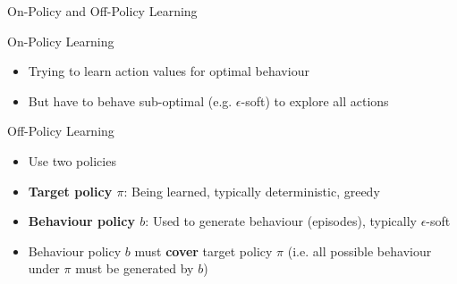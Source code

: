 \documentclass[ignorenonframetext,xcolor=x11names]{beamer}
\begin{document}
\begin{frame}{On-Policy and Off-Policy Learning}
\begin{block}{On-Policy Learning}
\begin{itemize}
   \item Trying to learn action values for optimal behaviour
   \item But have to behave sub-optimal (e.g. $\epsilon$-soft) to explore all actions
\end{itemize}
\end{block}

\begin{block}{Off-Policy Learning}
\begin{itemize}
   \item Use two policies
   \item \textbf{Target policy $\pi$}: Being learned, typically deterministic, greedy
   \item \textbf{Behaviour policy $b$}: Used to generate behaviour (episodes), typically $\epsilon$-soft
   \item Behaviour policy $b$ must \textbf{cover} target policy $\pi$ (i.e. all possible behaviour under $\pi$ must be generated by $b$)
\end{itemize}
\end{block}
\end{frame}

\end{document}
